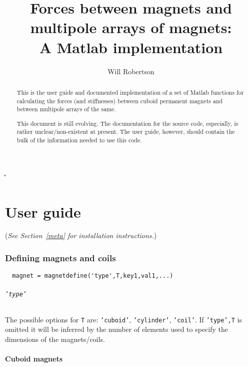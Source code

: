 \documentclass{article}
\begin{document}
\MakeShortVerb\|
\MakeShortVerb\"
\title{Forces between magnets and multipole arrays of magnets:\\ A Matlab implementation}
\author{Will Robertson}
\maketitle
\vfil
\begin{abstract}
This is the user guide and documented implementation of a set of
Matlab functions for calculating the forces (and stiffnesses) between
cuboid permanent magnets and between multipole arrays of the same.

This document is still evolving. The documentation for the source code,
especially, is rather unclear/non-existent at present. The user guide,
however, should contain the bulk of the information needed to use this code.
\end{abstract}

\newpage
\tableofcontents

\newpage

\part{User guide}

(\emph{See Section~\ref{meta} for installation instructions.})

\section{Defining magnets and coils}

\begin{Verbatim}
  magnet = magnetdefine('type',T,key1,val1,...)
\end{Verbatim}

\paragraph{\texttt{'type'}}
The possible options for \texttt{T} are: \texttt{'cuboid'}, \texttt{'cylinder'}, \texttt{'coil'}.
If \texttt{'type',T} is omitted it will be inferred by the number of elements used to specify the dimensions of the magnets/coils.

\subsection{Cuboid magnets}
\end{document}
